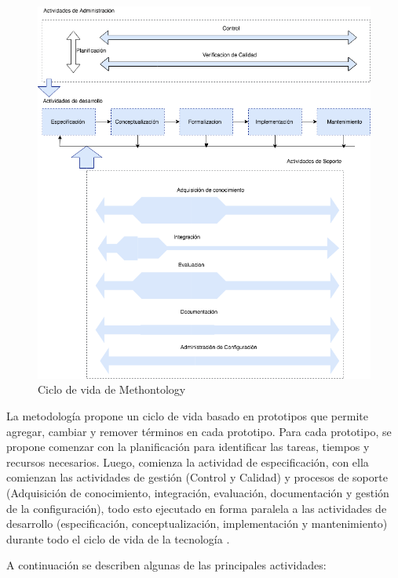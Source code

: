 \begin{figure}[h!]
    \centering
    \includegraphics[width=150mm]{figuras/Diagramas-MethontologyProcess}
    \caption{Ciclo de vida de Methontology}
    \label{img:methontology}
    \end{figure}
    
    
La metodología propone un ciclo de vida basado en prototipos que permite agregar, cambiar y remover términos en cada prototipo. Para cada prototipo, se propone comenzar con la planificación para identificar las tareas, tiempos y recursos necesarios. Luego, comienza la actividad de especificación, con ella comienzan las actividades de gestión (Control y Calidad) y procesos de soporte (Adquisición de conocimiento, integración, evaluación, documentación y gestión de la configuración), todo esto ejecutado en forma paralela a las actividades de desarrollo (especificación, conceptualización, implementación y mantenimiento) durante todo el ciclo de vida de la tecnología \cite{fernandez1997methontology}.
 
A continuación se describen algunas de las principales actividades:


